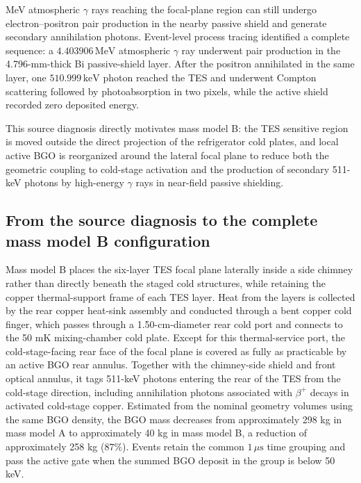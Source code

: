 \documentclass[11pt]{article}
\newcommand{\keV}{\ensuremath{\,\mathrm{keV}}}
\newcommand{\MeV}{\ensuremath{\,\mathrm{MeV}}}
\begin{document}
MeV atmospheric $\gamma$ rays reaching the focal-plane region can still undergo electron--positron pair production in the nearby passive shield and generate secondary annihilation photons. Event-level process tracing identified a complete sequence: a $4.403906\MeV$ atmospheric $\gamma$ ray underwent pair production in the 4.796-mm-thick Bi passive-shield layer. After the positron annihilated in the same layer, one $510.999\keV$ photon reached the TES and underwent Compton scattering followed by photoabsorption in two pixels, while the active shield recorded zero deposited energy.

This source diagnosis directly motivates mass model B: the TES sensitive region is moved outside the direct projection of the refrigerator cold plates, and local active BGO is reorganized around the lateral focal plane to reduce both the geometric coupling to cold-stage activation and the production of secondary 511-keV photons by high-energy $\gamma$ rays in near-field passive shielding.
\endgroup

\FloatBarrier

\subsection{From the source diagnosis to the complete mass model B configuration}
\label{subsec:optimized_shield_results}

Mass model B places the six-layer TES focal plane laterally inside a side chimney rather than directly beneath the staged cold structures, while retaining the copper thermal-support frame of each TES layer. Heat from the layers is collected by the rear copper heat-sink assembly and conducted through a bent copper cold finger, which passes through a 1.50-cm-diameter rear cold port and connects to the 50 mK mixing-chamber cold plate. Except for this thermal-service port, the cold-stage-facing rear face of the focal plane is covered as fully as practicable by an active BGO rear annulus. Together with the chimney-side shield and front optical annulus, it tags 511-keV photons entering the rear of the TES from the cold-stage direction, including annihilation photons associated with $\beta^+$ decays in activated cold-stage copper. Estimated from the nominal geometry volumes using the same BGO density, the BGO mass decreases from approximately 298 kg in mass model A to approximately 40 kg in mass model B, a reduction of approximately 258 kg ($87\%$). Events retain the common $1\,\mu\mathrm{s}$ time grouping and pass the active gate when the summed BGO deposit in the group is below 50 keV.
\end{document}
